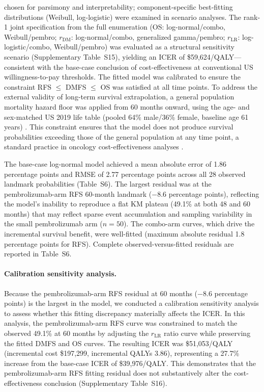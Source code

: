 \documentclass[12pt,a4paper]{article}
\begin{document}
chosen for parsimony and interpretability; component-specific best-fitting distributions (Weibull, log-logistic) were examined in scenario analyses. The rank-1 joint specification from the full enumeration (OS: log-normal/combo, Weibull/pembro; $r_{\text{DM}}$: log-normal/combo, generalized gamma/pembro; $r_{\text{LR}}$: log-logistic/combo, Weibull/pembro) was evaluated as a structural sensitivity scenario (Supplementary Table~S15), yielding an ICER of \$59,624/QALY---consistent with the base-case conclusion of cost-effectiveness at conventional US willingness-to-pay thresholds. The fitted model was calibrated to ensure the constraint RFS $\leq$ DMFS $\leq$ OS was satisfied at all time points. To address the external validity of long-term survival extrapolation, a general population mortality hazard floor was applied from 60 months onward, using the age- and sex-matched US 2019 life table (pooled 64\% male/36\% female, baseline age 61 years) \cite{arias2022}. This constraint ensures that the model does not produce survival probabilities exceeding those of the general population at any time point, a standard practice in oncology cost-effectiveness analyses \cite{latimer2011,zhang2023}.

The base-case log-normal model achieved a mean absolute error of 1.86 percentage points and RMSE of 2.77 percentage points across all 28 observed landmark probabilities (Table~S6). The largest residual was at the pembrolizumab-arm RFS 60-month landmark ($-8.6$ percentage points), reflecting the model's inability to reproduce a flat KM plateau (49.1\% at both 48 and 60 months) that may reflect sparse event accumulation and sampling variability in the small pembrolizumab arm ($n=50$). The combo-arm curves, which drive the incremental survival benefit, were well-fitted (maximum absolute residual 1.8 percentage points for RFS). Complete observed-versus-fitted residuals are reported in Table~S6.

\paragraph{Calibration sensitivity analysis.} Because the pembrolizumab-arm RFS residual at 60 months ($-8.6$ percentage points) is the largest in the model, we conducted a calibration sensitivity analysis to assess whether this fitting discrepancy materially affects the ICER. In this analysis, the pembrolizumab-arm RFS curve was constrained to match the observed 49.1\% at 60 months by adjusting the $r_{\text{LR}}$ ratio curve while preserving the fitted DMFS and OS curves. The resulting ICER was \$51,053/QALY (incremental cost \$197,299, incremental QALYs 3.86), representing a 27.7\% increase from the base-case ICER of \$39,976/QALY. This demonstrates that the pembrolizumab-arm RFS fitting residual does not substantively alter the cost-effectiveness conclusion (Supplementary Table~S16).
\end{document}
